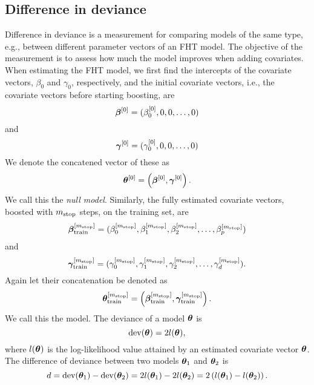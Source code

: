 \subsection{Difference in deviance}
Difference in deviance is a measurement for comparing models of the same type, e.g., between different parameter vectors of an FHT model.
The objective of the measurement is to assess how much the model improves when adding covariates.
When estimating the FHT model, we first find the intercepts of the covariate vectors, $\beta_0$ and $\gamma_0$, respectively,
and the initial covariate vectors, i.e., the covariate vectors before starting boosting, are
\begin{equation*}
    \boldsymbol{\beta}^{[0]}=(\beta_0^{[0]},0,0,\ldots,0)
\end{equation*}
and
\begin{equation*}
    \boldsymbol{\gamma}^{[0]}=(\gamma_0^{[0]},0,0,\ldots,0)
\end{equation*}
We denote the concatened vector of these as
\begin{equation*}
    \boldsymbol{\theta}^{[0]}=\left(\boldsymbol{\beta}^{[0]},\boldsymbol{\gamma}^{[0]}\right).
\end{equation*}
We call this the \textit{null model}.
Similarly, the fully estimated covariate vectors, boosted with $m_{\text{stop}}$ steps, on the training set, are
\begin{equation*}
    \boldsymbol{\beta}^{[m_{\text{stop}}]}_{\text{train}}=(\beta_0^{[m_{\text{stop}}]},\beta_1^{[m_{\text{stop}}]},\beta_2^{[m_{\text{stop}}]},\ldots,\beta_p^{[m_{\text{stop}}]})
\end{equation*}
and
\begin{equation*}
    \boldsymbol{\gamma}^{[m_{\text{stop}}]}_{\text{train}}=(\gamma_0^{[m_{\text{stop}}]},\gamma_1^{[m_{\text{stop}}]},\gamma_2^{[m_{\text{stop}}]},\ldots,\gamma_d^{[m_{\text{stop}}]}).
\end{equation*}
Again let their concatenation be denoted as
\begin{equation*}
    \boldsymbol{\theta}^{[m_{\text{stop}}]}_{\text{train}}=\left(\boldsymbol{\beta}^{[m_{\text{stop}}]}_{\text{train}},\boldsymbol{\gamma}^{[m_{\text{stop}}]}_{\text{train}}\right).
\end{equation*}
We call this the model.
The deviance of a model $\boldsymbol{\theta}$ is
\begin{equation}
    \text{dev}(\boldsymbol{\theta})=2l(\boldsymbol{\theta}),
\end{equation}
where $l(\boldsymbol{\theta})$ is the log-likelihood value attained by an estimated covariate vector $\boldsymbol{\theta}$.
The difference of deviance between two models $\boldsymbol{\theta}_1$ and $\boldsymbol{\theta}_2$ is
\begin{equation}
    d=\text{dev}(\boldsymbol{\theta}_1)-\text{dev}(\boldsymbol{\theta}_2)=2l(\boldsymbol{\theta}_1)-2l(\boldsymbol{\theta}_2)=2\left(l(\boldsymbol{\theta}_1)-l(\boldsymbol{\theta}_2)\right).
\end{equation}
